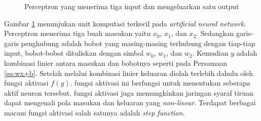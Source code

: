 \begin{figure}[H]
    \centering
    \caption{Perceptron yang menerima tiga input dan mengeluarkan satu output}
    \label{fig: Perceptron}
\end{figure}

Gambar \ref{fig: Perceptron} menunjukan unit komputasi terkecil pada \textit{artificial neural network}. Perceptron menerima tiga buah masukan yaitu $x_0$, $x_1$, dan $x_2$. Sedangkan garis-garis penghubung adalah bobot yang masing-masing terhubung dengan tiap-tiap input, bobot-bobot dituliskan dengan simbol $w_0$, $w_1$, dan $w_2$. Kemudian $y$ adalah kombinasi linier antara masukan dan bobotnya seperti pada Persamaan \ref{eq:wx+b}. Setelah melalui kombinasi linier keluaran diolah terlebih dahulu oleh fungsi aktivasi $f(y)$. fungsi aktivasi ini berfungsi untuk menentukan seberapa aktif neuron tersebut. fungsi aktivasi juga memungkinkan jaringan syaraf tiruan dapat mengenali pola masukan dan keluaran yang \textit{non-linear}. Terdapat berbagai macam fungsi aktivasi salah satunya adalah \textit{step function}.

